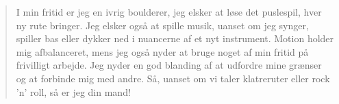 \documentclass[10pt,a4paper,ragged2e,withhyper]{altacv}
\begin{document}


\divider


\divider


\divider


\divider


\divider

    \begin{quote}
        I min fritid er jeg en ivrig boulderer, jeg elsker at løse det puslespil, hver ny rute bringer. Jeg elsker også at spille musik, uanset om jeg synger, spiller bas eller dykker ned i nuancerne af et nyt instrument. Motion holder mig afbalanceret, mens jeg også nyder at bruge noget af min fritid på frivilligt arbejde. Jeg nyder en god blanding af at udfordre mine grænser og at forbinde mig med andre. Så, uanset om vi taler klatreruter eller rock 'n' roll, så er jeg din mand!
    \end{quote}
    
\end{document}
